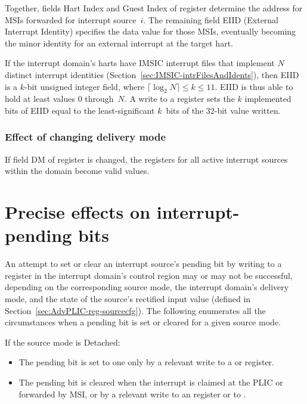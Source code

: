 Together, fields Hart Index and Guest Index of register 
determine the address for MSIs forwarded for interrupt source~$i$.
The remaining field EIID (External Interrupt Identity) specifies the
data value for those MSIs, eventually becoming the minor identity for
an external interrupt at the target hart.

If the interrupt domain's harts have IMSIC interrupt
files that implement $N$ distinct interrupt identities
(Section~\ref{sec:IMSIC-intrFilesAndIdents}), then
EIID is a \mbox{$k$-bit} unsigned integer field, where
$\lceil\log_{2}N\rceil \leq k \leq \mbox{11}$.
EIID is thus able to hold at least values 0 through~$N$.
A write to a  register sets the $k$ implemented bits of EIID
equal to the least-significant $k$~bits of the \mbox{32-bit} value
written.

\subsubsection*{Effect of changing delivery mode}

If field DM of register  is changed, the 
registers for all active interrupt sources within the domain become
{\unspecified} valid values.

\section{Precise effects on interrupt-pending bits}
\label{sec:AdvPLIC-pendingBits}

An attempt to set or clear an interrupt source's pending bit by
writing to a register in the interrupt domain's control region
may or may not be successful, depending on the corresponding
source mode, the interrupt domain's delivery mode, and the
state of the source's rectified input value (defined in
Section~\ref{sec:AdvPLIC-reg-sourcecfg}).
The following enumerates all the circumstances when a pending bit is
set or cleared for a given source mode.

If the source mode is Detached:\nopagebreak
\begin{itemize}

\item
The pending bit is set to one only by a relevant write to a 
or  register.

\item
The pending bit is cleared when the interrupt is claimed at the PLIC or
forwarded by MSI, or by a relevant write to an  register
or to .

\end{itemize}

